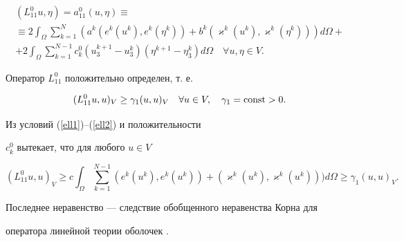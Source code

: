 \begin{gather*}


(L^{0}_{11}u,\eta ) = a^{0}_{11}(u,\eta ) \equiv\\


%


\equiv


2 \int _{\Omega } \sum ^{N}_{k=1} 


(a^{k}(e^{k}(u^{k}),e^{k}(\eta ^{k})) + 


b^{k}(\varkappa ^{k}(u^{k}),\varkappa ^{k}(\eta ^{k})))d\Omega +\\


%


+ 2\int _{\Omega } \sum ^{N-1}_{k=1}c_{k}^0(u^{k+1}_{3} - u^{k}_{3})


(\eta ^{k+1} - \eta ^{k}_{3}) d\Omega \quad \forall u,\eta \in V.


\end{gather*}





\begin{lem} 


\label{fulldef1}


Оператор $L^{0}_{11} $ положительно определен, т. е.


$$


(L^{0}_{11}u,u)_{V} \ge \gamma _{1}(u,u)_{V} \quad


 \forall u \in V,\quad \gamma _{1} = \const >0.


$$


\end{lem} 





\begin{pf} Из условий (\ref{ell1})--(\ref{ell2}) и положительности 


$c_k^0$ вытекает, что для любого $u \in V$


\begin{equation}


\label{Korn}


(L^{0}_{11}u,u)_{V} \ge 


c \int _{\Omega } \sum ^{N-1}_{k=1} (e^{k}(u^{k}),


e^{k}(u^{k})) + (\varkappa ^{k}(u^{k}),


\varkappa ^{k}(u^{k})))d\Omega 


\ge \gamma _{1}(u,u)_{V}.


\end{equation}


Последнее неравенство --- следствие обобщенного неравенства Корна для


оператора линейной теории оболочек \cite{Kor}.


\end{pf}


